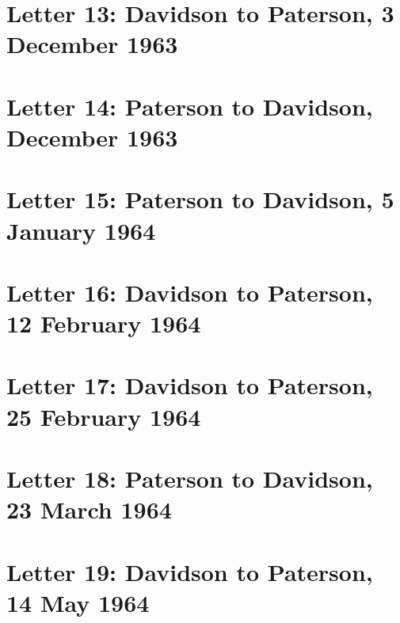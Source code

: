\documentclass[a4paper,11pt,abstracton,hidelinks]{scrartcl}
\begin{document}
\section{Letter 13: Davidson to Paterson, 3 December 1963}


\section{Letter 14: Paterson to Davidson, December 1963}


\section{Letter 15: Paterson to Davidson, 5 January 1964}


\section{Letter 16: Davidson to Paterson, 12 February 1964}


\section{Letter 17: Davidson to Paterson, 25 February 1964}


\section{Letter 18: Paterson to Davidson, 23 March 1964}


\section{Letter 19: Davidson to Paterson, 14 May 1964}

\end{document}
